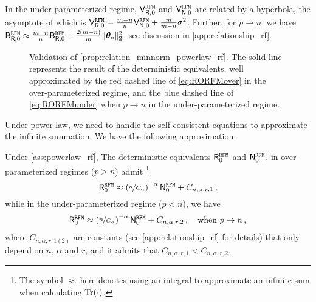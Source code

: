 In the under-parameterized regime, $\mathsf V^{\tt RFM}_{\mathsf R,0}$ and $\mathsf V^{\tt RFM}_{\mathsf N,0}$ are related by a hyperbola, the asymptote of which is $\mathsf V^{\tt RFM}_{\mathsf R,0} = \frac{m-n}{n}\mathsf V^{\tt RFM}_{\mathsf N,0} + \frac{m}{m-n} \sigma^2$. Further, for $p \to n$, we have $\mathsf B^{\tt RFM}_{\mathsf R,0} \approx \frac{m-n}{n}\mathsf B^{\tt RFM}_{\mathsf R,0} + \frac{2(m-n)}{m}\|{\boldsymbol \theta}_*\|_2^2$, see discussion in \cref{app:relationship_rf}.


\begin{figure}[t]
    \centering
    \caption{Validation of \cref{prop:relation_minnorm_powerlaw_rf}. 
    The solid line represents the result of the deterministic equivalents, well approximated by the {\color{red}red dashed line} of \cref{eq:RORFMover} in the over-parameterized regime, and the {\color{blue}blue dashed line} of \cref{eq:RORFMunder} when $p \to n$ in the under-parameterized regime.}
    \label{fig:random_feature_risk_vs_norm_approx}\vspace{-0.05cm}
\end{figure}



Under power-law, we need to handle the self-consistent equations to approximate the infinite summation. We have the following approximation.
\begin{corollary}\label{prop:relation_minnorm_powerlaw_rf}
    Under \cref{ass:powerlaw_rf}, The deterministic equivalents $\mathsf R^{\tt RFM}_{0}$ and $\mathsf N^{\tt RFM}_{0}$, in over-parameterized regimes ($p>n$) admit \footnote{The symbol $\approx$ here denotes using an integral to approximate an infinite sum when calculating ${\rm Tr}(\cdot)$.}
    \begin{equation}\label{eq:RORFMover}
            \mathsf R_0^{\tt RFM} \approx \left(\nicefrac{n}{C_\alpha}\right)^{-\alpha} \mathsf N_0^{\tt RFM} + C_{n,\alpha,r,1}\,,  
    \end{equation}
    while in the under-parameterized regime ($p<n$), we have
    \begin{align}\label{eq:RORFMunder}
        \mathsf R_0^{\tt RFM} \approx \left(\nicefrac{n}{C_{\alpha}}\right)^{-\alpha}\mathsf N_0^{\tt RFM} + C_{n,\alpha,r,2}\,, \quad \mbox{when}~p \to n \,,
    \end{align}
where \( C_{n,\alpha,r,1 (2)} \) are constants (see \cref{app:relationship_rf} for details) that only depend on $n$, $\alpha$ and $r$, and it admits that $C_{n,\alpha,r,1} <  C_{n,\alpha,r,2}$.
\end{corollary}


